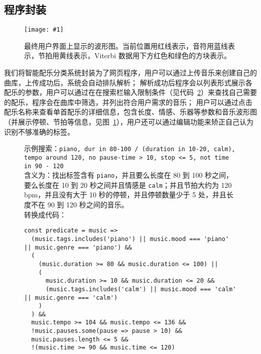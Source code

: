 \documentclass[a4paper,utf8,10pt]{article}
\newcommand{\somefigure}[4]{
  \begin{figure}[#4]
    \begin{center}
      \vspace{-10pt}
      \texttt{[image: \#1]}
      \vspace{-10pt}
      \caption{#2}
      \label{#3}
      \vspace{-10pt}
    \end{center}
  \end{figure}
}
\begin{document}
\subsection{程序封装}

\somefigure{images/wave.1522x434.jpg}{最终用户界面上显示的波形图。当前位置用红线表示，音符用蓝线表示，节拍用黄线表示，Viterbi 数据用下方红色和绿色的方块表示。}{fig:wave}{h}

我们将智能配乐分类系统封装为了网页程序，用户可以通过上传音乐来创建自己的曲库，上传成功后，系统会自动排队解析；
解析成功后程序会以列表形式展示各配乐的参数，用户可以通过在在搜索栏输入限制条件（见代码~\ref{lst:search}）来查找自己需要的配乐，程序会在曲库中筛选，并列出符合用户需求的音乐；
用户可以通过点击配乐名称来查看单首配乐的详细信息，包含长度、情感、乐器等参数和音乐波形图（并展示停顿、节拍等信息，见图~\ref{fig:wave}），用户还可以通过编辑功能来矫正自己认为识别不够准确的标签。

\begin{figure}
\vspace{-20pt}
 \label{lst:search}
示例搜索：\texttt{piano, dur in 80-100 / (duration in 10-20, calm), tempo around 120, no pause-time > 10, stop <= 5, not time in 90 - 120}\\
含义为：找出标签含有 \texttt{piano}，并且要么长度在 80 到 100 秒之间，要么长度在 10 到 20 秒之间并且情感是 \texttt{calm}；并且节拍大约为 120 bpm，并且没有大于 10 秒的停顿，并且停顿数量少于 5 处，并且长度不在 90 到 120 秒之间的音乐。\\
转换成代码：
\begin{verbatim}
const predicate = music =>
  (music.tags.includes('piano') || music.mood === 'piano' || music.genre === 'piano') &&
  (
    (music.duration >= 80 && music.duration <= 100) ||
    (
      music.duration >= 10 && music.duration <= 20 &&
      (music.tags.includes('calm') || music.mood === 'calm' || music.genre === 'calm')
    )
  ) &&
  music.tempo >= 104 && music.tempo <= 136 &&
  !music.pauses.some(pause => pause > 10) &&
  music.pauses.length <= 5 &&
  !(music.time >= 90 && music.time <= 120)
\end{verbatim}
\end{figure}
\end{document}
